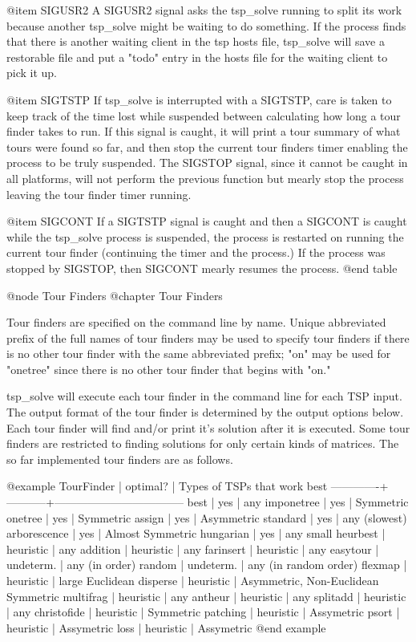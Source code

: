 @item SIGUSR2
A SIGUSR2 signal asks the tsp_solve running to split its work because another
tsp_solve might be waiting to do something.  If the process finds that there
is another waiting client in the tsp hosts file, tsp_solve will save a
restorable file and put a "todo" entry in the hosts file for the waiting
client to pick it up.

@item SIGTSTP
If tsp_solve is interrupted with a SIGTSTP, care is taken to keep track of the
time lost while suspended between calculating how long a tour finder takes to
run.  If this signal is caught, it will print a tour summary of what tours were
found so far, and then stop the current tour finders timer enabling the process
to be truly suspended.  The SIGSTOP signal, since it cannot be caught in all
platforms, will not perform the previous function but mearly stop the process
leaving the tour finder timer running.

@item SIGCONT
If a SIGTSTP signal is caught and then a SIGCONT is caught while the tsp_solve
process is suspended, the process is restarted on running the current tour
finder (continuing the timer and the process.)  If the process was stopped by
SIGSTOP, then SIGCONT mearly resumes the process.
@end table


@node Tour Finders
@chapter Tour Finders

Tour finders are specified on the command line by name.  Unique abbreviated
prefix of the full names of tour finders may be used to specify tour finders
if there is no other tour finder with the same abbreviated prefix; "on" may
be used for "onetree" since there is no other tour finder that begins with
"on."

tsp_solve will execute each tour finder in the command line for each TSP
input.  The output format of the tour finder is determined by the output
options below.  Each tour finder will find and/or print it's solution after
it is executed.  Some tour finders are restricted to finding solutions for
only certain kinds of matrices.  The so far implemented tour finders are as
follows.

@example
TourFinder   |  optimal? | Types of TSPs that work best
-------------+-----------+-----------------------------------
best         |    yes    | any
imponetree   |    yes    | Symmetric
onetree      |    yes    | Symmetric
assign       |    yes    | Asymmetric
standard     |    yes    | any (slowest)
arborescence |    yes    | Almost Symmetric
hungarian    |    yes    | any small
heurbest     | heuristic | any
addition     | heuristic | any
farinsert    | heuristic | any
easytour     | undeterm. | any (in order)
random       | undeterm. | any (in random order)
flexmap      | heuristic | large Euclidean
disperse     | heuristic | Asymmetric, Non-Euclidean Symmetric
multifrag    | heuristic | any
antheur      | heuristic | any
splitadd     | heuristic | any
christofide  | heuristic | Symmetric
patching     | heuristic | Assymetric
psort        | heuristic | Assymetric
loss         | heuristic | Assymetric
@end example

